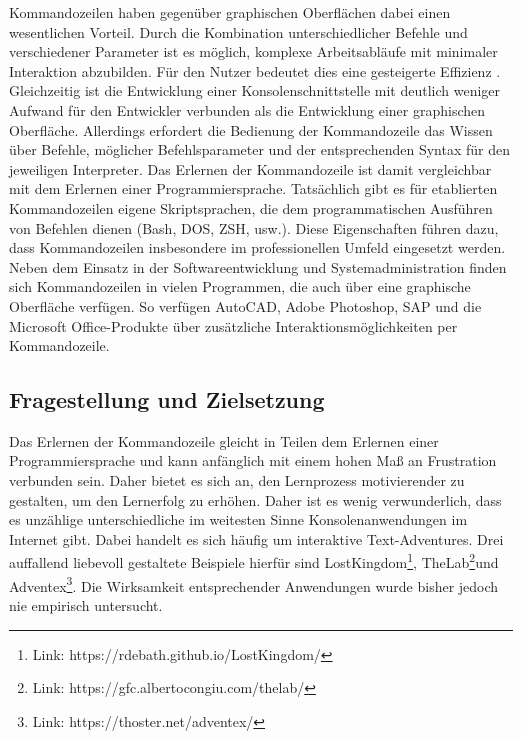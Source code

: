 Kommandozeilen haben gegenüber graphischen Oberflächen dabei einen wesentlichen Vorteil. Durch die Kombination unterschiedlicher Befehle und verschiedener Parameter ist es möglich, komplexe Arbeitsabläufe mit minimaler Interaktion abzubilden. Für den Nutzer bedeutet dies eine gesteigerte Effizienz \cite{Kumar2005}. Gleichzeitig ist die Entwicklung einer Konsolenschnittstelle mit deutlich weniger Aufwand für den Entwickler verbunden als die Entwicklung einer graphischen Oberfläche. Allerdings erfordert die Bedienung der Kommandozeile das Wissen über Befehle, möglicher Befehlsparameter und der entsprechenden Syntax für den jeweiligen Interpreter. Das Erlernen der Kommandozeile ist damit vergleichbar mit dem Erlernen einer Programmiersprache. Tatsächlich gibt es für etablierten Kommandozeilen eigene Skriptsprachen, die dem programmatischen Ausführen von Befehlen dienen (Bash, DOS, ZSH, usw.). Diese Eigenschaften führen dazu, dass Kommandozeilen insbesondere im professionellen Umfeld eingesetzt werden. Neben dem Einsatz in der Softwareentwicklung und Systemadministration finden sich Kommandozeilen in vielen Programmen, die auch über eine graphische Oberfläche verfügen. So verfügen AutoCAD, Adobe Photoshop, SAP und die Microsoft Office-Produkte über zusätzliche Interaktionsmöglichkeiten per Kommandozeile.




\subsection{Fragestellung und Zielsetzung}
Das Erlernen der Kommandozeile gleicht in Teilen dem Erlernen einer Programmiersprache und kann anfänglich mit einem hohen Maß an Frustration verbunden sein. Daher bietet es sich an, den Lernprozess motivierender zu gestalten, um den Lernerfolg zu erhöhen. Daher ist es wenig verwunderlich, dass es unzählige unterschiedliche im weitesten Sinne  Konsolenanwendungen im Internet gibt. Dabei handelt es sich häufig um interaktive Text-Adventures. Drei auffallend liebevoll gestaltete Beispiele hierfür sind LostKingdom\footnote{Link: https://rdebath.github.io/LostKingdom/}, TheLab\footnote{Link: https://gfc.albertocongiu.com/thelab/}und Adventex\footnote{Link: https://thoster.net/adventex/}. Die Wirksamkeit entsprechender Anwendungen wurde bisher jedoch nie empirisch untersucht. 

